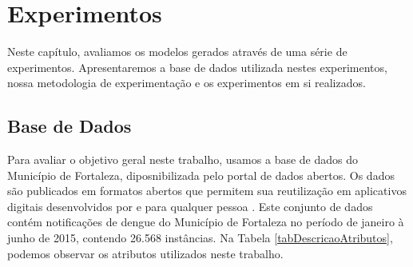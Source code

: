 \documentclass[
	12pt,				%
	openright,			%
	oneside,	
	a4paper,				%
	english,				%
	brazil				%
]{abntex2/abntex2} %
\begin{document}
	
\chapter{Experimentos}

	Neste capítulo, avaliamos os modelos gerados através de uma série de experimentos. Apresentaremos a base de dados utilizada nestes experimentos, nossa metodologia de experimentação e os experimentos em si realizados.

	\section{Base de Dados}
	
	Para avaliar o objetivo geral neste trabalho, usamos a base de dados  do Município de Fortaleza, diposnibilizada pelo portal de dados abertos. Os dados são publicados em formatos abertos que permitem sua reutilização  em aplicativos digitais desenvolvidos por e para qualquer pessoa \cite{fortaleza:2015}. Este conjunto de dados contém notificações de dengue do Município de Fortaleza no período de janeiro à junho de 2015, contendo 26.568 instâncias. Na Tabela \ref{tabDescricaoAtributos}, podemos observar os atributos utilizados neste trabalho.
\end{document}
